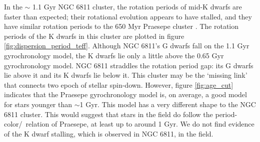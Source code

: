 In the $\sim$ 1.1 Gyr NGC 6811 cluster, the rotation periods of mid-K dwarfs
are faster than expected; their rotational evolution appears to have stalled,
and they have similar rotation periods to the 650 Myr Praesepe cluster
\citep{curtis2019}.
The rotation periods of the K dwarfs in this cluster are plotted in figure
\ref{fig:dispersion_period_teff}.
Although NGC 6811's G dwarfs fall on the 1.1 Gyr gyrochronology model, the K
dwarfs lie only a little above the 0.65 Gyr gyrochronology model.
NGC 6811 straddles the rotation period gap: its G dwarfs lie above it and its
K dwarfs lie below it.
This cluster may be the `missing link' that connects two epoch of stellar
spin-down.
However, figure \ref{fig:age_cut} indicates that the Praesepe gyrochronology
model is, on average, a good model for stars younger than $\sim$1 Gyr. This
model has a very different shape to the NGC 6811 cluster.
This would suggest that stars in the field do follow the period-color/\teff\
relation of Praesepe, at least up to around 1 Gyr.
We do not find evidence of the K dwarf stalling, which is observed in NGC
6811, in the field.


